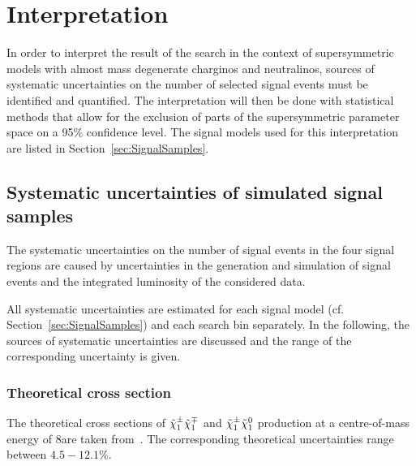 \FloatBarrier
\chapter{Interpretation}
\label{sec:Interpretation}
In order to interpret the result of the search in the context of supersymmetric models with almost mass degenerate charginos and neutralinos, sources of systematic uncertainties on the number of selected signal events must be identified and quantified.
The interpretation will then be done with statistical methods that allow for the exclusion of parts of the supersymmetric parameter space on a 95\% confidence level.
The signal models used for this interpretation are listed in Section~\ref{sec:SignalSamples}.

\section{Systematic uncertainties of simulated signal samples}
The systematic uncertainties on the number of signal events in the four signal regions are caused by uncertainties in the generation and simulation of signal events and the integrated luminosity of the considered data.

All systematic uncertainties are estimated for each signal model (cf. Section~\ref{sec:SignalSamples}) and each search bin separately.
In the following, the sources of systematic uncertainties are discussed and the range of the corresponding uncertainty is given.

\subsection*{Theoretical cross section}
The theoretical cross sections of $\tilde{\chi}^{\pm}_{1}\tilde{\chi}^{\mp}_{1}$ and $\tilde{\chi}^{\pm}_{1}\tilde{\chi}^{0}_{1}$ production at a centre-of-mass energy of 8\tev are taken from~\cite{bib:SignalCrossSection_2012,bib:SignalCrossSection_2013}.
The corresponding theoretical uncertainties range between $4.5-12.1\%$.

